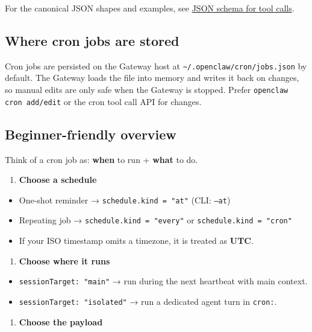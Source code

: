 For the canonical JSON shapes and examples, see \href{/automation/cron-jobs\#json-schema-for-tool-calls}{JSON schema for tool calls}.

\subsection{Where cron jobs are stored}


Cron jobs are persisted on the Gateway host at \texttt{\textasciitilde{}/.openclaw/cron/jobs.json} by default.
The Gateway loads the file into memory and writes it back on changes, so manual edits
are only safe when the Gateway is stopped. Prefer \texttt{openclaw cron add/edit} or the cron
tool call API for changes.

\subsection{Beginner-friendly overview}


Think of a cron job as: \textbf{when} to run + \textbf{what} to do.

\begin{enumerate}
  \item \textbf{Choose a schedule}
\end{enumerate}

\begin{itemize}
  \item One-shot reminder → \texttt{schedule.kind = "at"} (CLI: \texttt{--at})
  \item Repeating job → \texttt{schedule.kind = "every"} or \texttt{schedule.kind = "cron"}
  \item If your ISO timestamp omits a timezone, it is treated as \textbf{UTC}.
\end{itemize}


\begin{enumerate}
  \item \textbf{Choose where it runs}
\end{enumerate}

\begin{itemize}
  \item \texttt{sessionTarget: "main"} → run during the next heartbeat with main context.
  \item \texttt{sessionTarget: "isolated"} → run a dedicated agent turn in \texttt{cron:}.
\end{itemize}


\begin{enumerate}
  \item \textbf{Choose the payload}
\end{enumerate}


